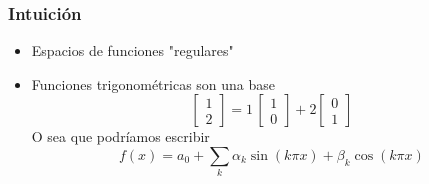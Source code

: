 \documentclass[12pt,aspectratio=169,xcolor=dvipsnames]{beamer}
\begin{document}
\begin{frame}\frametitle{Intuición}
    \begin{itemize}
        \item Espacios de funciones "regulares"
        \item Funciones trigonométricas son una base
            $$ \begin{bmatrix} 1 \\ 2 \end{bmatrix} = 1 \, \begin{bmatrix} 1 \\ 0\end{bmatrix} + 2 \begin{bmatrix} 0 \\ 1\end{bmatrix} $$
            O sea que podríamos escribir
            $$ f(x) = a_0 + \sum_k \alpha_k \sin (k\pi x) + \beta_k \cos(k \pi x) $$
    \end{itemize}

\end{frame}
\end{document}
